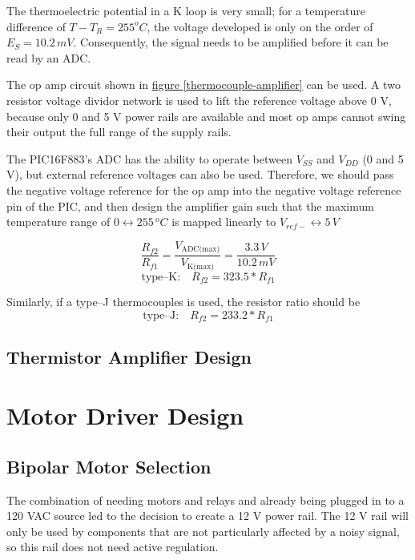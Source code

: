 \documentclass[10pt, twocolumn]{article}
\begin{document}
The thermoelectric potential in a K loop is very small; 
for a temperature difference of $T-T_{R}=255^{o}C$,
the voltage developed is only on the order of $E_{S}=10.2\,mV$.
Consequently, the signal needs to be amplified before it can be read by an ADC.

The op amp circuit shown in
\hyperref[thermocouple-amplifier]{figure \ref{thermocouple-amplifier}}
can be used. A two resistor voltage dividor network is used to lift the reference
voltage above 0 V, because only 0 and 5 V power rails are available and most
op amps cannot swing their output the full range of the supply rails.

The \textrm{PIC16F883}'s ADC has the ability to operate between $V_{SS}$ and $V_{DD}$ (0 and 5 V),
but external reference voltages can also be used. Therefore, we should pass the
negative voltage reference for the op amp into the negative voltage reference pin of the PIC,
and then design the amplifier gain such that the maximum temperature range of $0\leftrightarrow255\,^{o}C$
is mapped linearly to $V_{ref-}\leftrightarrow5\,V$

\begin{equation*}
	\frac{R_{f2}}{R_{f1}}=
	\frac{V_{\textrm{ADC(max)}}}{V_{\textrm{K(max)}}}=
	\frac{3.3\,V}{10.2\,mV}
\end{equation*}
\begin{equation}
\textrm{type--K:}\quad R_{f2}=323.5*R_{f1}
\end{equation}

Similarly, if a type--J thermocouples is used, the resistor ratio should be
\begin{equation}
\textrm{type--J:}\quad R_{f2}=233.2*R_{f1}
\end{equation}

\subsection{Thermistor Amplifier Design}

\section{Motor Driver Design}

\subsection{Bipolar Motor Selection}

The combination of needing motors and relays and already being plugged in to a 
120 VAC source led to the decision to create a 12 V power rail. The 12 V rail
will only be used by components that are not particularly affected by a noisy
signal, so this rail does not need active regulation.
\end{document}
